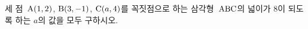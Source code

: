 세 점~$\mathrm{A}(1{,}\mkern3mu\mathopen{}2)$, $\mathrm{B}(3{,}\mkern3mu\mathopen{}-1)$, $\mathrm{C}(a{,}\mkern3mu\mathopen{}4)$를 꼭짓점으로 하는 삼각형~$\mathrm{ABC}$의 넓이가 $8$이 되도록 하는 $a$의 값을 모두 구하시오.
